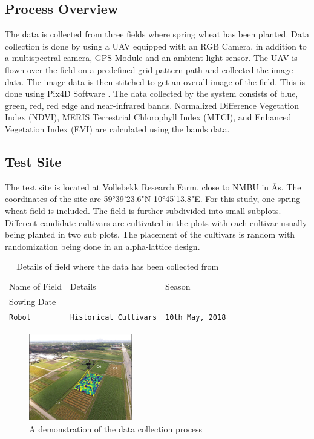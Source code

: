 \documentclass[sigconf, nonacm, natbib, screen, balance=False]{acmart}
\begin{document}
\subsection{Process Overview}\label{sec:aspect1}

The data is collected from three fields where spring wheat has been planted. Data collection is done by using a UAV equipped with an RGB Camera, in addition to a multispectral camera, GPS Module and an ambient light sensor. The UAV is flown over the field on a predefined grid pattern path and collected the image data. The image data is then stitched to get an overall image of the field. This is done using Pix4D Software \cite{lied}. The data collected by the system consists of blue, green, red, red edge and near-infrared bands. Normalized Difference Vegetation Index (NDVI), MERIS Terrestrial Chlorophyll Index (MTCI), and Enhanced Vegetation Index (EVI) are calculated using the bands data.

\subsection{Test Site}\label{sec:aspect1}

The test site is located at Vollebekk Research Farm, close to NMBU in Ås. The coordinates of the site are 59°39'23.6"N 10°45'13.8"E. For this study, one spring wheat field is included. The field is further subdivided into small subplots. Different candidate cultivars are cultivated in the plots with each cultivar usually being planted in two sub plots. The placement of the cultivars is random with randomization being done in an alpha-lattice design. 


\begin{table}[h!]
  \caption{Details of field where the data has been collected from}
  \label{tab:fields}
  \begin{tabular}{lll}
    \hline
    Name of Field & Details & Season\\Sowing Date \\\hline
    \verb!Robot! & \verb!Historical Cultivars! & \verb!10th May, 2018! \\
  \end{tabular}
\end{table}


\begin{figure}[h]
  \centering
   \hspace*{-0.25in}
   \includegraphics[width=0.4\textwidth, angle=0,]{moghimi.jpg}
  \caption{A demonstration of the data collection process \cite{moghimi}}

  \label{fig:example}
\end{figure}
\end{document}
